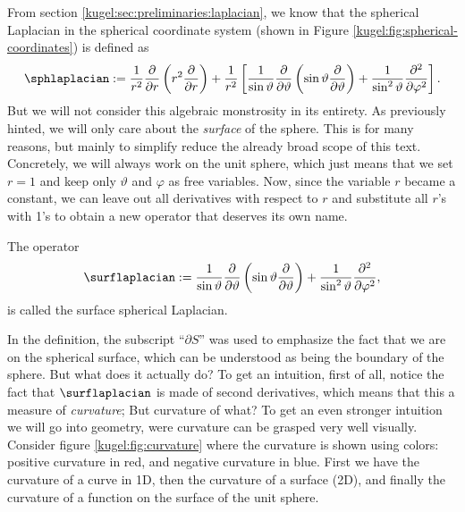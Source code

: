 From section \ref{kugel:sec:preliminaries:laplacian}, we know that the spherical
Laplacian in the spherical coordinate system (shown in Figure
\ref{kugel:fig:spherical-coordinates}) is defined as
\begin{equation*}
    \sphlaplacian :=
      \frac{1}{r^2} \frac{\partial}{\partial r} \left(
        r^2 \frac{\partial}{\partial r}
      \right)
      + \frac{1}{r^2} \left[
          \frac{1}{\sin\vartheta} \frac{\partial}{\partial \vartheta} \left(
            \sin\vartheta \frac{\partial}{\partial\vartheta}
          \right)
        + \frac{1}{\sin^2 \vartheta} \frac{\partial^2}{\partial\varphi^2}
      \right].
\end{equation*}
But we will not consider this algebraic monstrosity in its entirety. As
previously hinted, we will only care about the \emph{surface} of the sphere.
This is for many reasons, but mainly to simplify reduce the already broad scope
of this text. Concretely, we will always work on the unit sphere, which just
means that we set $r = 1$ and keep only $\vartheta$ and $\varphi$ as free
variables.  Now, since the variable $r$ became a constant, we can leave out all
derivatives with respect to $r$ and substitute all $r$'s with 1's to obtain a
new operator that deserves its own name.

\begin{definition}
  \label{kugel:def:surface-laplacian}
  The operator
  \begin{equation*}
      \surflaplacian :=
        \frac{1}{\sin\vartheta} \frac{\partial}{\partial \vartheta} \left(
          \sin\vartheta \frac{\partial}{\partial\vartheta}
        \right)
        + \frac{1}{\sin^2 \vartheta} \frac{\partial^2}{\partial\varphi^2},
  \end{equation*}
  is called the surface spherical Laplacian.
\end{definition}

In the definition, the subscript ``$\partial S$'' was used to emphasize the fact
that we are on the spherical surface, which can be understood as being the
boundary of the sphere. But what does it actually do? To get an intuition, first
of all, notice the fact that $\surflaplacian$ is made of second derivatives,
which means that this a measure of \emph{curvature}; But curvature of what? To
get an even stronger intuition we will go into geometry, were curvature can be
grasped very well visually. Consider figure \ref{kugel:fig:curvature} where the
curvature is shown using colors: positive curvature in red, and negative
curvature in blue. First we have the curvature of a curve in 1D, then the
curvature of a surface (2D), and finally the curvature of a function on the
surface of the unit sphere.

